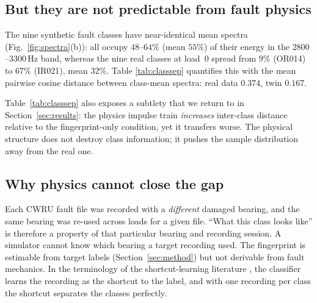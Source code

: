 \documentclass[journal]{IEEEtran}
\begin{document}
\subsection{But they are not predictable from fault physics}
The nine synthetic fault classes have near-identical mean spectra
(Fig.~\ref{fig:spectra}(b)): all occupy
$48$--$64\%$ (mean $55\%$) of their energy in the $2800$--$3300$\,Hz band,
whereas the nine real classes at load~0 spread from $9\%$ (OR014) to $67\%$
(IR021), mean $32\%$. Table
\ref{tab:classsep} quantifies this with the mean pairwise cosine distance
between class-mean spectra: real data $0.374$, twin $0.167$.

\begin{table}[t]
\centering
\caption{Mean pairwise cosine distance between class-mean magnitude spectra
(higher = classes better separated). Target load~3.}
\label{tab:classsep}
\small
{}
\end{table}

Table~\ref{tab:classsep} also exposes a subtlety that we return to in
Section~\ref{sec:results}: the physics impulse train \emph{increases}
inter-class distance relative to the fingerprint-only condition, yet it
transfers worse. The physical structure does not destroy class information; it
pushes the sample distribution away from the real one.

\subsection{Why physics cannot close the gap}
Each CWRU fault file was recorded with a \emph{different} damaged bearing, and
the same bearing was re-used across loads for a given file. ``What this class
looks like'' is therefore a property of that particular bearing and recording
session. A simulator cannot know which bearing a target recording used. The
fingerprint is estimable from target labels (Section~\ref{sec:method}) but not
derivable from fault mechanics. In the terminology of the shortcut-learning
literature \cite{geirhos2020shortcut}, the classifier learns the recording as
the shortcut to the label, and with one recording per class the shortcut
separates the classes perfectly.
\end{document}
